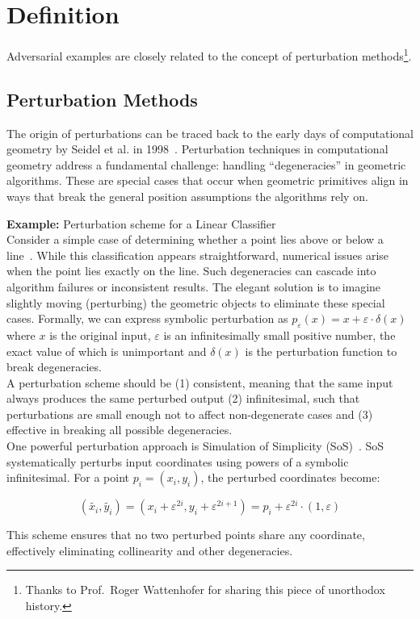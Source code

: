 \documentclass[a4paper, oneside]{discothesis}
\begin{document}
\section{Definition}

Adversarial examples are closely related to the concept of perturbation methods\footnote{Thanks to Prof.\ Roger Wattenhofer for sharing this piece of unorthodox history.}.

\subsection{Perturbation Methods}

The origin of perturbations can be traced back to the early days of computational geometry by Seidel et al. in 1998~\cite{seidel1998nature}. Perturbation techniques in computational geometry address a fundamental challenge: handling ``degeneracies'' in geometric algorithms. These are special cases that occur when geometric primitives align in ways that break the general position assumptions the algorithms rely on.

\begin{highlightbox}
	\textbf{Example:} Perturbation scheme for a Linear Classifier \\

	Consider a simple case of determining whether a point lies above or below a line~\cite{de2000computational}. While this classification appears straightforward, numerical issues arise when the point lies exactly on the line. Such degeneracies can cascade into algorithm failures or inconsistent results. The elegant solution is to imagine slightly moving (perturbing) the geometric objects to eliminate these special cases. Formally, we can express symbolic perturbation as $p_\varepsilon(x) = x + \varepsilon \cdot \delta(x)$ where $x$ is the original input, $\varepsilon$ is an infinitesimally small positive number, the exact value of which is unimportant and $\delta(x)$ is the perturbation function to break degeneracies. \\

	A perturbation scheme should be (1) consistent, meaning that the same input always produces the same perturbed output (2) infinitesimal, such that perturbations are small enough not to affect non-degenerate cases and (3) effective in breaking all possible degeneracies. \\

	One powerful perturbation approach is Simulation of Simplicity (SoS)~\cite{franklin2022implementing, edelsbrunner2002topological, edelsbrunner2001sink, edelsbrunner1990simulation, levy2016robustness, schorn1993axiomatic}. SoS systematically perturbs input coordinates using powers of a symbolic infinitesimal. For a point $p_i = (x_i, y_i)$, the perturbed coordinates become:

	$$(\tilde{x_i}, \tilde{y_i}) = (x_i + \varepsilon^{2i}, y_i + \varepsilon^{2i+1}) = p_i + \varepsilon^{2i} \cdot (1, \varepsilon)$$

	This scheme ensures that no two perturbed points share any coordinate, effectively eliminating collinearity and other degeneracies.
\end{highlightbox}
\end{document}
